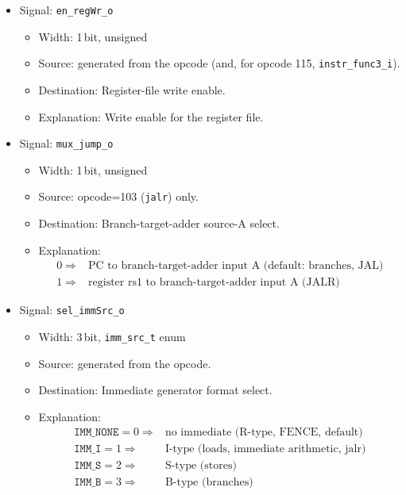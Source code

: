 \begin{itemize}
  \item Signal: \texttt{en\_regWr\_o}
  \begin{itemize}
    \item Width: 1\,bit, unsigned
    \item Source: generated from the opcode (and, for opcode 115, \texttt{instr\_func3\_i}).
    \item Destination: Register-file write enable.
    \item Explanation: Write enable for the register file.
  \end{itemize}
  \item Signal: \texttt{mux\_jump\_o}
  \begin{itemize}
    \item Width: 1\,bit, unsigned
    \item Source: opcode=103 (\texttt{jalr}) only.
    \item Destination: Branch-target-adder source-A select.
    \item Explanation: \[ \begin{array}{ll}
                                              0 \Rightarrow & \mbox{PC to branch-target-adder input A (default: branches, JAL)} \\
                                              1 \Rightarrow & \mbox{register rs1 to branch-target-adder input A (JALR)}
                                              \end{array} \]
  \end{itemize}
  \item Signal: \texttt{sel\_immSrc\_o}
  \begin{itemize}
    \item Width: 3\,bit, \texttt{imm\_src\_t} enum
    \item Source: generated from the opcode.
    \item Destination: Immediate generator format select.
    \item Explanation: \[ \begin{array}{ll}
                                              \texttt{IMM\_NONE}=0 \Rightarrow & \mbox{no immediate (R-type, FENCE, default)} \\
                                              \texttt{IMM\_I}=1 \Rightarrow & \mbox{I-type (loads, immediate arithmetic, jalr)} \\
                                              \texttt{IMM\_S}=2 \Rightarrow & \mbox{S-type (stores)} \\
                                              \texttt{IMM\_B}=3 \Rightarrow & \mbox{B-type (branches)} \\

\end{array}\]
\end{itemize}
\end{itemize}
